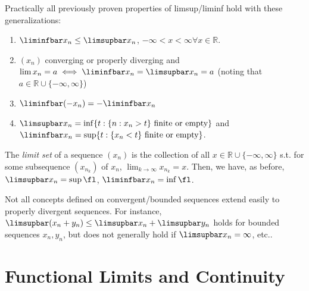 \documentclass[12pt]{article}
\begin{document}
\begin{proposition}
  Practically all previously proven properties of limsup/liminf hold with these generalizations:
  \begin{enumerate}
    \item $\liminfbar x_n \leq \limsupbar x_n$, $-\infty < x < \infty \forall x \in \mathbb{R}$.
    \item $(x_n)$ converging or properly diverging and $\lim x_n = a \iff \liminfbar x_n= \limsupbar x_n = a$ (noting that $a \in \mathbb{R} \cup \{-\infty, \infty\}$\footnotemark)
    \item $\liminfbar (-x_n) = - \liminfbar x_n$\footnotemark
    \item $\limsupbar x_n = \inf \{
      t : \{n : x_n > t\} \text{ finite or empty}
    \}$ and $\liminfbar x_n = \sup \{t : \{x_n < t\} \text{ finite or empty}\}$.\footnotemark
  \end{enumerate}
\end{proposition}


\begin{definition}
  The \textit{limit set} of a sequence $(x_n)$ is the collection of all $x \in \mathbb{R} \cup \{- \infty, \infty\}$ s.t. for some subsequence $(x_{n_k})$ of $x_n$, $\lim_{k\to\infty} x_{n_k} = x$. Then, we have, as before, $\limsupbar x_n = \sup \fl$, $\liminfbar x_n = \inf \fl$.
\end{definition}

\begin{remark}
  Not all concepts defined on convergent/bounded sequences extend easily to properly divergent sequences. For instance, $\limsupbar (x_n + y_n) \leq \limsupbar x_n + \limsupbar y_n$ holds for bounded sequences $x_n, y_n$, but does not generally hold if $\limsupbar x_n = \infty$, etc..
\end{remark}

\section{Functional Limits and Continuity}
\end{document}
